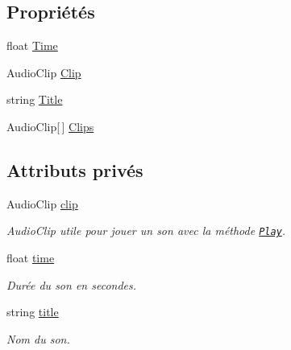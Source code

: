 \subsection*{Propriétés}
\begin{DoxyCompactItemize}
\item 
float \hyperlink{class_sound_af23b0067b9f8a8431635e45467a26f47}{Time}
\item 
Audio\+Clip \hyperlink{class_sound_a607ab2942d9e326299b6f5b4302b4b35}{Clip}
\item 
string \hyperlink{class_sound_a2e949808e2fbfbc883a94e8743d5297b}{Title}
\item 
Audio\+Clip\mbox{[}$\,$\mbox{]} \hyperlink{class_sound_ada3b25bf02b92b6d0190ad5541b3e4d8}{Clips}
\end{DoxyCompactItemize}
\subsection*{Attributs privés}
\begin{DoxyCompactItemize}
\item 
Audio\+Clip \hyperlink{class_sound_ab7878c271c13d5e8fbdf25714e363b77}{clip}
\begin{DoxyCompactList}\small\item\em Audio\+Clip utile pour jouer un son avec la méthode \href{http://docs.unity3d.com/ScriptReference/AudioSource.Play.html}{\tt Play}. \end{DoxyCompactList}\item 
float \hyperlink{class_sound_a2b67e874a75d0d390d37cdbaa2f51087}{time}
\begin{DoxyCompactList}\small\item\em Durée du son en secondes. \end{DoxyCompactList}\item 
string \hyperlink{class_sound_a17853cdf74f081a79ba4e658c6e25a13}{title}
\begin{DoxyCompactList}\small\item\em Nom du son. \end{DoxyCompactList}\end{DoxyCompactItemize}



